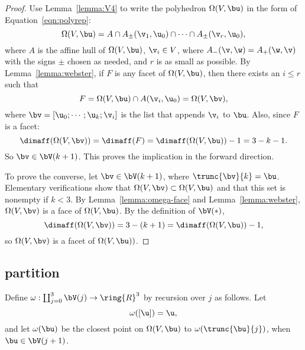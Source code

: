\begin{proof}
  Use Lemma~\ref{lemma:V4} to write the polyhedron $\Omega(V,\bu)$ in
  the form of Equation~\ref{eqn:polyrep}:
\begin{displaymath}
\Omega(V,\bu) = A \cap A_\pm(\v_1,\u_0) \cap \cdots\cap A_\pm(\v_r,\u_0),
\end{displaymath}
where $A$ is the affine hull of $\Omega(V,\bu)$, $\v_i\in V$, 
where $A_-(\v,\w) = A_+(\w,\v)$ with the signs $\pm$  chosen as
needed, 
and $r$ is as small as possible.
By Lemma~\ref{lemma:webster}, if $F$ is any facet of $\Omega(V,\bu)$, then there exists
an $i\le r$ such that 
\begin{displaymath}
F = \Omega(V,\bu) \cap A(\v_i,\u_0) = \Omega(V,\bv),
\end{displaymath}
where $\bv = [\u_0;\cdots;\u_k;\v_i]$ is the list that appends $\v_i$ to $\bu$.
Also, since $F$ is a facet:
\begin{displaymath}
\dimaff(\Omega(V,\bv)) = \dimaff(F) = \dimaff(\Omega(V,\bu)) - 1 = 3 - k - 1.
\end{displaymath}
So $\bv \in \bV(k+1)$.  This proves the implication in the forward direction.

To prove the converse, let $\bv\in \bV(k+1)$, where $\trunc{\bv}{k} =
\bu$.  Elementary verifications show that $\Omega(V,\bv)\subset
\Omega(V,\bu)$ and that this set is nonempty if $k<3$.  By
Lemma~\ref{lemma:omega-face} and Lemma~\ref{lemma:webster},
$\Omega(V,\bv)$ is a face of $\Omega(V,\bu)$.  By the definition of
$\bV(*)$,
\begin{displaymath}
\dimaff(\Omega(V,\bv)) = 3 - (k+1) = \dimaff(\Omega(V,\bu)) -1,
\end{displaymath}
so $\Omega(V,\bv)$ is a facet of $\Omega(V,\bu))$.
\end{proof}

\subsection{partition}

\begin{definition}[$\omega$]
Define $\omega: \coprod_{j=0}^3 \bV(j)\to \ring{R}^3$ by recursion over $j$ as follows.
Let \begin{displaymath}
\omega([\u]) = \u,
\end{displaymath} and
let $\omega( \bu)$ be the closest point on $\Omega(V, \bu)$ to
$\omega( \trunc{\bu}{j})$, when $\bu\in \bV(j+1)$.
\end{definition}

